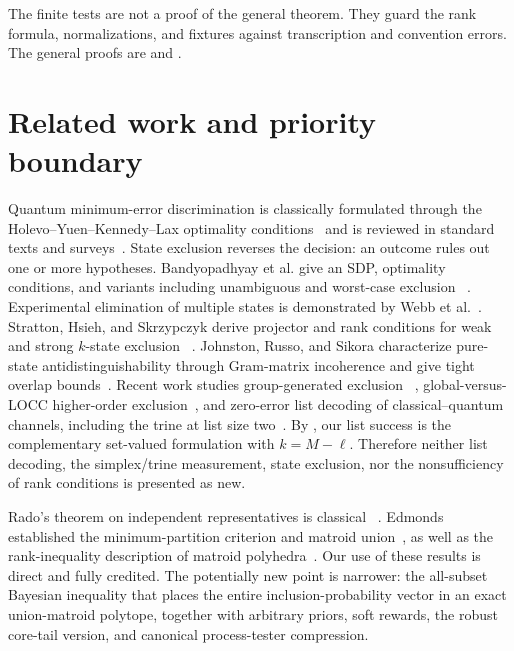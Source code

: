\documentclass[11pt]{article}
\theoremstyle{definition}
\theoremstyle{remark}
\begin{document}
The finite tests are not a proof of the general theorem.  They guard the rank
formula, normalizations, and fixtures against transcription and convention
errors.  The general proofs are
 and
.

\section{Related work and priority boundary}\label{sec:related}

Quantum minimum-error discrimination is classically formulated through the
Holevo--Yuen--Kennedy--Lax optimality conditions~\cite{holevo1973,yuen1975}
and is reviewed in standard texts and surveys~\cite{helstrom1976,barnett2009}.
State exclusion reverses the decision: an outcome rules out one or more
hypotheses.  Bandyopadhyay et al. give an SDP, optimality conditions, and
variants including unambiguous and worst-case exclusion
~\cite{bandyopadhyay2014}.  Experimental elimination of multiple states is
demonstrated by Webb et al.~\cite{webb2023}.  Stratton, Hsieh, and Skrzypczyk
derive projector and rank conditions for weak and strong $k$-state exclusion
~\cite{stratton2024}.  Johnston, Russo, and Sikora characterize pure-state
antidistinguishability through Gram-matrix incoherence and give tight overlap
bounds~\cite{johnston2025}.  Recent work studies group-generated exclusion
~\cite{yao2026}, global-versus-LOCC higher-order exclusion~\cite{manna2026},
and zero-error list decoding of classical--quantum channels, including the
trine at list size two~\cite{dalai2026}.  By , our list
success is the complementary set-valued formulation with $k=M-\ell$.
Therefore neither list decoding, the simplex/trine measurement, state
exclusion, nor the nonsufficiency of rank conditions is presented as new.

Rado's theorem on independent representatives is classical
~\cite{rado1942}.  Edmonds established the minimum-partition criterion and
matroid union~\cite{edmonds1965,edmonds1968}, as well as the rank-inequality
description of matroid polyhedra~\cite{edmonds1970}.  Our use of these results
is direct and fully credited.  The potentially new point is narrower: the
all-subset Bayesian inequality that places the entire inclusion-probability
vector in an exact union-matroid polytope, together with arbitrary priors,
soft rewards, the robust core-tail version, and canonical process-tester
compression.
\end{document}
